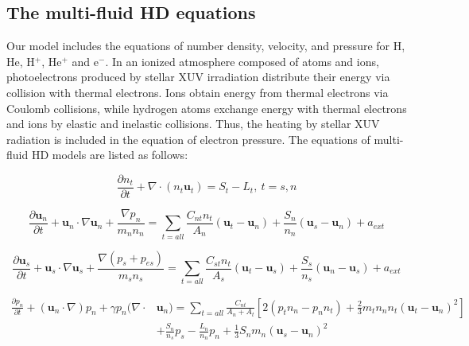 \documentclass[journal, onecolumn]{aastex631}
\begin{document}
\begin{CJK*}{UTF8}{gbsn}
\subsection{The multi-fluid HD equations}\label{sec:HD_equations}

Our model includes the equations of number density, velocity, and pressure for H, He, H$^+$, He$^+$ and e$^-$. In an ionized atmosphere composed of atoms and ions, photoelectrons produced by stellar XUV irradiation distribute their energy via collision with thermal electrons. Ions obtain energy from thermal electrons via Coulomb collisions, while hydrogen atoms exchange energy with thermal electrons and ions by elastic and inelastic collisions. Thus, the heating by stellar XUV radiation is included in the equation of electron pressure. The equations of multi-fluid HD models are listed as follows:


\begin{equation}\label{eq:continue_1}
\frac{\partial n_ {t}}{\partial t}+\nabla\cdot(n_ {t}\textbf{u}_ {t})=S_ {t}-L_ {t},\ t=s,n
\end{equation}

\begin{equation}\label{eq:n_momt_2}
\frac{\partial \textbf{u}_ {n}}{\partial t}+ \textbf{u}_ {n}\cdot\nabla\textbf{u}_{n}
+\frac{\nabla p_ {n}}{m_{n}n_{n}}
=\sum_{t=all}\frac{C_{nt}n_{t}}{A_{n}}(\textbf{u}_{t}-\textbf{u}_{n})
+\frac{S_{n}}{n_{n}}(\textbf{u}_{s}-\textbf{u}_{n})
+a_{ext}
\end{equation}

\begin{equation}\label{eq:i_momt_3}
\frac{\partial \textbf{u}_ {s}}{\partial t}+\textbf{u}_ {s}\cdot\nabla\textbf{u}_{s}
+\frac{\nabla (p_{s}+p_{es})}{m_{s}n_{s}}
=\sum_{t=all}\frac{C_{st}n_{t}}{A_{s}}(\textbf{u}_{t}-\textbf{u}_{s})
+\frac{S_{s}}{n_{s}}(\textbf{u}_{n}-\textbf{u}_{s})
+a_{ext}
\end{equation}

\begin{equation}\label{eq:n_prs_4}
\begin{aligned}
\frac{\partial p_{n}}{\partial t}+
(\textbf{u}_{n}\cdot\nabla)p_{n}+\gamma p_{n}(\nabla\cdot&\textbf{u}_{n})                                                                                                                                                                                                                                                                                                                                                                                      
=\sum_{t=all}\frac{C_{nt}}{A_{n}+A_{t}}[2(p_{t}n_{n}-p_{n}n_{t})+
\frac{2}{3}m_{t}n_{n}n_{t}(\textbf{u}_{t}-\textbf{u}_{n})^2
]\\
&+\frac{S_{n}}{n_{s}}p_{s}-\frac{L_{n}}{n_{n}}p_{n}
+\frac{1}{3}S_{n}m_{n}(\textbf{u}_{s}-\textbf{u}_{n})^2\\
\end{aligned}
\end{equation}


\end{CJK*}
\end{document}
